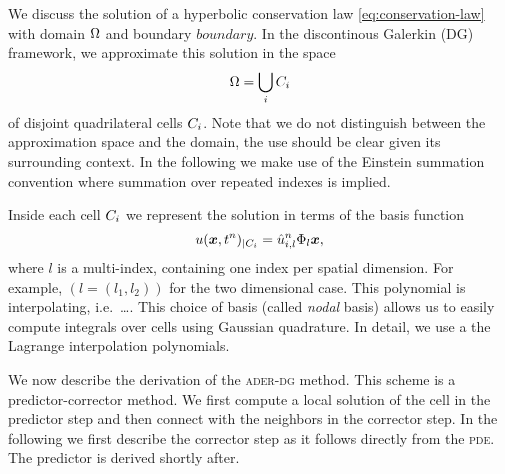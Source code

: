 We discuss the solution of a hyperbolic conservation law \cref{eq:conservation-law} with domain $\Omega$ and boundary $boundary$.
In the discontinous Galerkin (DG) framework, we approximate this solution in the space
\begin{equation}
  \label{eq:dg-space}
  \broken = \bigcup_i \cell
\end{equation}
of disjoint quadrilateral cells $C_{i}$.
Note that we do not distinguish between the approximation space and the domain, the use should be clear given its surrounding context.
In the following we make use of the Einstein summation convention where summation over repeated indexes is implied.

Inside each cell $C_{i}$ we represent the solution in terms of the basis function 
\begin{equation}
  \label{eq:cell-approx}
  u(\bm{x}, t^n)_{|\cell[i]} = \hat{u}^n_{i,l} \sbasis{l}{\bm{x}},
\end{equation}
where $l$ is a multi-index, containing one index per spatial dimension.
For example, $(l = (l_1, l_2))$ for the two dimensional case.
This polynomial is interpolating, i.e.\ \ldots{}.
This choice of basis (called \textit{nodal} basis) allows us to easily compute integrals over cells using Gaussian quadrature.
In detail, we use a the Lagrange interpolation polynomials.

We now describe the derivation of the \textsc{ader-dg} method.
This scheme is a predictor-corrector method.
We first compute a local solution of the cell in the predictor step and then connect with the neighbors in the corrector step.
In the following we first describe the corrector step as it follows directly from the \textsc{pde}.
The predictor is derived shortly after.

